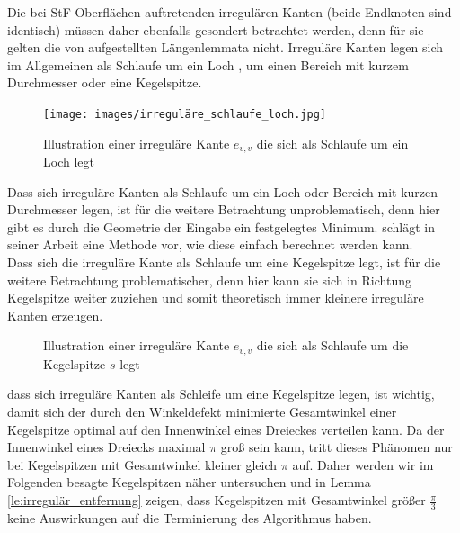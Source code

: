 Die bei StF-Oberflächen auftretenden irregulären Kanten (beide Endknoten sind identisch) müssen daher ebenfalls gesondert betrachtet werden, denn für sie gelten die von \citet{ruppert:1995:delaunay} aufgestellten Längenlemmata nicht. Irreguläre Kanten legen sich im Allgemeinen als Schlaufe um ein Loch \citeauthor{erickson:2005:generator}, um einen Bereich mit kurzem Durchmesser oder eine Kegelspitze.\\
 \begin{figure}[H]
    \centering
    \texttt{[image: images/irreguläre\_schlaufe\_loch.jpg]}
    \caption{Illustration einer  irreguläre Kante $e_{v,v}$ die sich als Schlaufe um ein Loch legt }%
    \label{fig:Punkt_einfügen}
\end{figure}
 


Dass sich irreguläre Kanten als Schlaufe um ein Loch oder Bereich mit kurzen Durchmesser legen, ist für die weitere Betrachtung unproblematisch, denn hier gibt es durch die Geometrie der Eingabe ein festgelegtes Minimum.  \citet{erickson:2005:generator}  schlägt in seiner Arbeit eine Methode vor, wie diese einfach berechnet werden kann.\\
Dass sich die irreguläre Kante als Schlaufe um eine Kegelspitze legt, ist für die weitere Betrachtung problematischer, denn hier kann sie sich in Richtung Kegelspitze  weiter zuziehen und somit theoretisch immer kleinere irreguläre Kanten erzeugen.
 \begin{figure}[H]
    \centering
    
    \caption{Illustration einer  irreguläre Kante $e_{v,v}$ die sich als Schlaufe um die Kegelspitze $s$ legt \cite{erickson:2005:generator}}%
    \label{fig:Punkt_einfügen}
\end{figure}
 
dass sich irreguläre Kanten als Schleife um eine Kegelspitze legen, ist wichtig, damit sich der durch den Winkeldefekt minimierte Gesamtwinkel einer Kegelspitze optimal auf den Innenwinkel eines Dreieckes verteilen kann. Da der Innenwinkel eines Dreiecks maximal $\pi$ groß sein kann, tritt dieses Phänomen nur bei Kegelspitzen mit Gesamtwinkel kleiner gleich $\pi$ auf. Daher werden wir im Folgenden besagte Kegelspitzen näher untersuchen und in Lemma \ref{le:irregulär_entfernung} zeigen, dass Kegelspitzen mit Gesamtwinkel größer $\frac{\pi}{3}$ keine Auswirkungen auf die Terminierung des Algorithmus haben. 








